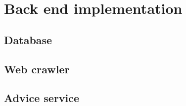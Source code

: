\section{Back end implementation}
\subsection{Database}
\subsection{Web crawler}
\subsection{Advice service}